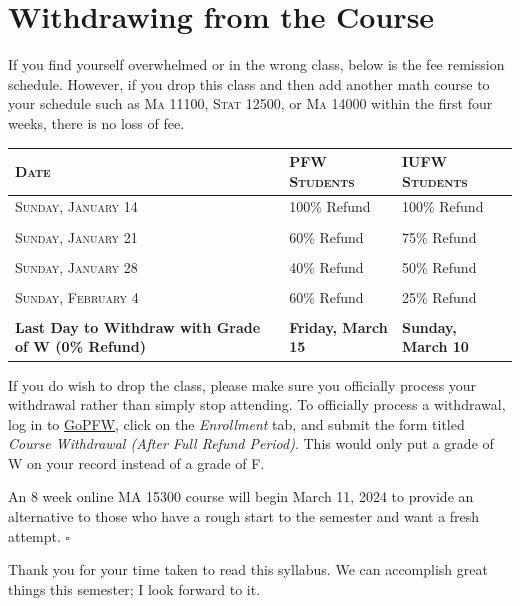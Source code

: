 \documentclass[letterpaper,twoside]{article}
\begin{document}
\section*{Withdrawing from the Course}

If you find yourself overwhelmed or in the wrong class, below is the fee remission schedule. 
However, if you drop this class and then add another math course to your schedule such as \textsc{Ma} 11100, \textsc{Stat} 12500, or \textsc{Ma} 14000 within the first four weeks, there is no loss of fee.

    \begin{center}
        \onehalfspacing
        \begin{tabular}{lll}
            \textsc{Date} & \textsc{PFW Students} & \textsc{IUFW Students}\\
            \hline
            \textsc{Sunday, January 14} & 100\% Refund & 100\% Refund\\
            \\
            \textsc{Sunday, January 21} & 60\% Refund & 75\% Refund\\
            \\
            \textsc{Sunday, January 28} & 40\% Refund & 50\% Refund\\
            \\
            \textsc{Sunday, February 4} & 60\% Refund & 25\% Refund\\
            \\
            \small\textbf{Last Day to Withdraw with Grade of W (0\% Refund)} & \normalsize\textbf{Friday, March 15} & \textbf{Sunday, March 10}\\
        \end{tabular}
    \end{center}

If you do wish to drop the class, please make sure you officially process your withdrawal rather than simply stop attending. 
To officially process a withdrawal, log in to \href{https://go.pfw.edu}{GoPFW}, click on the \textit{Enrollment} tab, and submit the form titled \textit{Course Withdrawal (After Full Refund Period)}. This would only put a grade of W on your record instead of a grade of F. 

An 8 week online MA 15300 course will begin March 11, 2024 to provide an alternative to those who have a rough start to the semester and want a fresh attempt. \hfill $\square$

Thank you for your time taken to read this syllabus.
We can accomplish great things this semester; I look forward to it.
\end{document}
